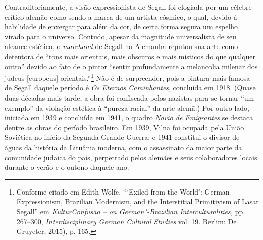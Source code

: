Contraditoriamente, a visão expressionista de Segall foi elogiada por um
célebre crítico alemão como sendo a marca de um artista cósmico, o qual,
devido à habilidade de enxergar para além da cor, de certa forma segura
um espelho virado para o universo. Contudo, apesar da magnitude
universalista de seu alcance estético, o \textit{marchand} de Segall na Alemanha
reputou sua arte como detentora de ``tons mais orientais, mais obscuros
e mais místicos do que qualquer outro'' devido ao fato de o pintor
``sentir profundamente a melancolia milenar dos judeus {[}europeus{]}
orientais.''\footnote{Conforme citado em Edith Wolfe, ```Exiled from
  the World': German Expressionism, Brazilian Modernism, and the
  Interstitial Primitivism of Lasar Segall'' em \textit{KulturConfusão -- on German"-Brazilian Interculturalities,} pp. 267--300, \textit{Interdisciplinary German Cultural Studies} vol. 19. Berlim: De
  Gruyeter, 2015), p. 165.} Não é de surpreender, pois a pintura mais
famosa de Segall daquele período é \textit{Os Eternos Caminhantes},
concluída em 1918. (Quase duas décadas mais tarde, a obra foi confiscada
pelos nazistas para se tornar ``um exemplo'' da violação estética à
``pureza racial'' da arte alemã.) Por outro lado, iniciada em 1939 e
concluída em 1941, o quadro \textit{Navio de Emigrantes} se destaca dentre
as obras do período brasileiro. Em 1939, Vilna foi ocupada pela União
Soviética no início da Segunda Grande Guerra; e 1941 constitui o divisor
de águas da história da Lituânia moderna, com o assassinato da maior
parte da comunidade judaica do país, perpetrado pelos alemães e seus
colaboradores locais durante o verão e o outono daquele ano.

